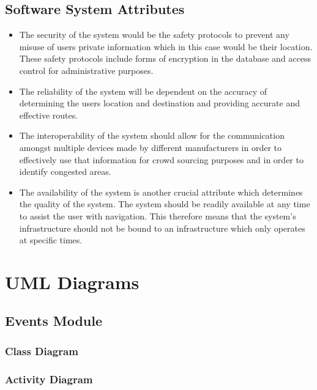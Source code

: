 \documentclass{article}
\begin{document}
	
		\subsection{Software System Attributes}\label{sec:design-constraints}
			\begin{itemize}
			\small
			\item The security of the system would be the safety protocols to prevent any misuse of users private information which in this case would be their location. These safety protocols include forms of encryption in the database and access control for administrative purposes.
			\item The reliability of the system will be dependent on the accuracy of determining the users location and destination and providing accurate and effective routes.
			\item The interoperability of the system should allow for the communication amongst multiple devices made by different manufacturers in order to effectively use that information for crowd sourcing purposes and in order to identify congested areas.
			\item The availability of the system is another crucial attribute which determines the quality of the system. The system should be readily available at any time to assist the user with navigation. This therefore means that the system’s infrastructure should not be bound to an infrastructure which only operates at specific times.
			\end{itemize}
			

		\clearpage
	
	\section{UML Diagrams}\label{sec:uml-diagrams}
	
		
		\subsection{Events Module}\label{subsec:uml-diagrams-events}
		
		
			\subsubsection{Class Diagram}\label{subsec:uml-diagrams-events-class}
			
			
			\subsubsection{Activity Diagram}\label{subsec:uml-diagrams-events-act}
			
\end{document}
